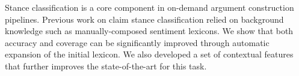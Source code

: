 Stance classification is a core component in on-demand argument construction pipelines. Previous work on claim stance classification relied on background knowledge such as manually-composed sentiment lexicons. We show that both accuracy and coverage can be significantly improved through automatic expansion of the initial lexicon. We also developed a set of contextual features that further improves the state-of-the-art for this task.
